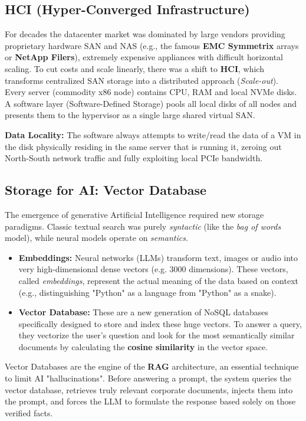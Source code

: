 \subsection{HCI (Hyper-Converged Infrastructure)}
For decades the datacenter market was dominated by large vendors providing proprietary hardware SAN and NAS (e.g., the famous \textbf{EMC Symmetrix} arrays or \textbf{NetApp Filers}), extremely expensive appliances with difficult horizontal scaling. 
To cut costs and scale linearly, there was a shift to \textbf{HCI}, which transforms centralized SAN storage into a distributed approach (\textit{Scale-out}). Every server (commodity x86 node) contains CPU, RAM and local NVMe disks. A software layer (Software-Defined Storage) pools all local disks of all nodes and presents them to the hypervisor as a single large shared virtual SAN.
\begin{tipbox}
\textbf{Data Locality:} The software always attempts to write/read the data of a VM in the disk physically residing in the same server that is running it, zeroing out North-South network traffic and fully exploiting local PCIe bandwidth.
\end{tipbox}

\subsection{Storage for AI: Vector Database}
The emergence of generative Artificial Intelligence required new storage paradigms. Classic textual search was purely \textit{syntactic} (like the \textit{bag of words} model), while neural models operate on \textit{semantics}.
\begin{itemize}
    \item \textbf{Embeddings:} Neural networks (LLMs) transform text, images or audio into very high-dimensional dense vectors (e.g. 3000 dimensions). These vectors, called \textit{embeddings}, represent the actual meaning of the data based on context (e.g., distinguishing "Python" as a language from "Python" as a snake).
    \item \textbf{Vector Database:} These are a new generation of NoSQL databases specifically designed to store and index these huge vectors. To answer a query, they vectorize the user's question and look for the most semantically similar documents by calculating the \textbf{cosine similarity} in the vector space.
\end{itemize}
\begin{tipbox}
Vector Databases are the engine of the \textbf{RAG} architecture, an essential technique to limit AI "hallucinations". Before answering a prompt, the system queries the vector database, retrieves truly relevant corporate documents, injects them into the prompt, and forces the LLM to formulate the response based solely on those verified facts.
\end{tipbox}

